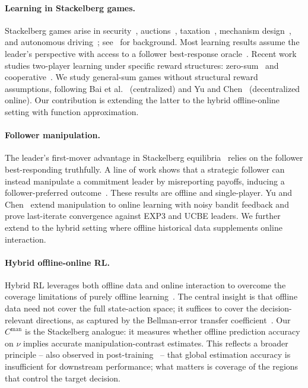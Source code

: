 \documentclass{article}
\begin{document}
\paragraph{Learning in Stackelberg games.}
Stackelberg games arise in security~\cite{tambe2011security, gan2018stackelberg}, auctions~\cite{myerson1981optimal, cole2014sample}, taxation~\cite{zheng2020ai}, mechanism design~\cite{conitzer2002complexity}, and autonomous driving~\cite{shalev2016safe}; see~\cite{roughgarden2010algorithmic} for background. Most learning results assume the leader's perspective with access to a follower best-response oracle~\cite{blum2014learning, peng2019learning, balcan2015commitment, letchford2009learning}. Recent work studies two-player learning under specific reward structures: zero-sum~\cite{goktas2022zero, sun2023zero} and cooperative~\cite{kao2022decentralized, zhao2023online}. We study general-sum games without structural reward assumptions, following Bai et al.~\cite{bai2021sample} (centralized) and Yu and Chen~\cite{yu2024decentralized} (decentralized online). Our contribution is extending the latter to the hybrid offline-online setting with function approximation.

\paragraph{Follower manipulation.}
The leader's first-mover advantage in Stackelberg equilibria~\cite{von2010leadership} relies on the follower best-responding truthfully. A line of work shows that a strategic follower can instead manipulate a commitment leader by misreporting payoffs, inducing a follower-preferred outcome~\cite{gan2019manipulating, gan2019imitative, nguyen2019imitative, birmpas2020optimally, chen2025optimal, chen2023learning}. These results are offline and single-player. Yu and Chen~\cite{yu2024decentralized} extend manipulation to online learning with noisy bandit feedback and prove last-iterate convergence against EXP3 and UCBE leaders. We further extend to the hybrid setting where offline historical data supplements online interaction.

\paragraph{Hybrid offline-online RL.}
Hybrid RL leverages both offline data and online interaction to overcome the coverage limitations of purely offline learning~\cite{song2022hybrid, wagenmaker2023leveraging, li2023reward, ball2023efficient, ren2024hybrid}. The central insight is that offline data need not cover the full state-action space; it suffices to cover the decision-relevant directions, as captured by the Bellman-error transfer coefficient~\cite{song2022hybrid}. Our $C^{\mathrm{man}}$ is the Stackelberg analogue: it measures whether offline prediction accuracy on $\nu$ implies accurate manipulation-contrast estimates. This reflects a broader principle -- also observed in post-training~\cite{chen2025coverage} -- that global estimation accuracy is insufficient for downstream performance; what matters is coverage of the regions that control the target decision.
\end{document}
